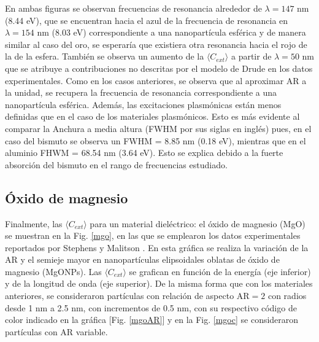 En ambas figuras se observan frecuencias de resonancia alrededor de $\lambda=147$ nm (8.44 eV), que se encuentran hacia el azul de la frecuencia de resonancia en $\lambda=154$ nm (8.03 eV) correspondiente a una nanopartícula esférica y de manera similar al caso del oro, se esperaría que existiera otra resonancia hacia el rojo de la de la esfera. También se observa un aumento de la $\langle C_{ext}\rangle$ a partir de $\lambda=50$ nm  que se atribuye a contribuciones no descritas por el modelo de Drude en los datos experimentales. Como en los casos anteriores, se observa que al aproximar AR a la unidad, se recupera la frecuencia de resonancia correspondiente a una nanopartícula esférica. Además, las excitaciones plasmónicas están menos definidas que en el caso de los materiales plasmónicos. Esto es más evidente al comparar la Anchura a media altura (FWHM por sus siglas en inglés) pues, en el caso del bismuto se observa un FWHM = 8.85 nm (0.18 eV), mientras que en el aluminio FHWM = 68.54 nm (3.64 eV). Esto se explica debido a la fuerte absorción del bismuto en el rango de frecuencias estudiado.





\subsection*{Óxido de magnesio}
Finalmente, las $\langle C_{ext}\rangle$ para un material dieléctrico: el óxido de magnesio (MgO) se muestran en la Fig. \ref{mgo}, en las que se emplearon los datos experimentales reportados por Stephens y Malitson \cite{MgO}. En esta gráfica se realiza la variación de la AR y el semieje mayor en nanopartículas elipsoidales oblatas de óxido de magnesio (MgONPs). Las $\langle C_{ext}\rangle$ se grafican en función de la energía (eje inferior) y de la longitud de onda (eje superior). De la misma forma que con los materiales anteriores, se consideraron partículas con relación de aspecto AR$=2$ con radios desde 1  nm a 2.5 nm, con incrementos de 0.5 nm, con su respectivo código de color indicado en la gráfica [Fig. \ref{mgoAR}] y en la Fig. \ref{mgoc} se consideraron partículas con AR variable. 

